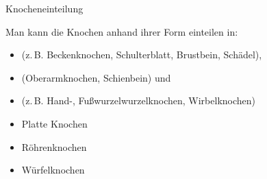 {Knocheneinteilung}
{%
Man kann die Knochen anhand ihrer Form einteilen in: 
\begin{itemize}
    \item {} (z.\,B. Beckenknochen,
    Schulterblatt, Brustbein, Schädel),
    \item {} (Oberarmknochen, Schienbein)
    und
    \item {} (z.\,B. Hand-, Fußwurzelwurzelknochen,
    Wirbelknochen)
\end{itemize}
}
{
\begin{itemize}
  \item Platte Knochen
  \item Röhrenknochen
  \item Würfelknochen
\end{itemize}
}
{}{}{}


